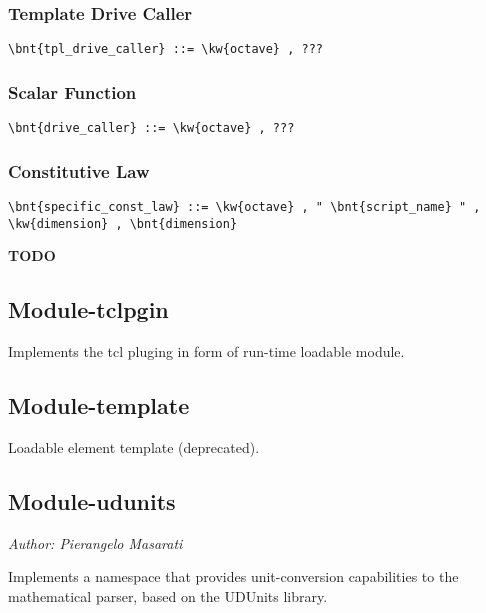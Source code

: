 \subsubsection{Template Drive Caller}
\begin{Verbatim}[commandchars=\\\{\}]
    \bnt{tpl_drive_caller} ::= \kw{octave} , ???
\end{Verbatim}

\subsubsection{Scalar Function}
\begin{Verbatim}[commandchars=\\\{\}]
    \bnt{drive_caller} ::= \kw{octave} , ???
\end{Verbatim}

\subsubsection{Constitutive Law}
\begin{Verbatim}[commandchars=\\\{\}]
    \bnt{specific_const_law} ::= \kw{octave} , " \bnt{script_name} " , \kw{dimension} , \bnt{dimension}
\end{Verbatim}

\textbf{TODO}



\subsection{Module-tclpgin}
Implements the tcl pluging in form of run-time loadable module.
 
\subsection{Module-template}
Loadable element template (deprecated).

\subsection{Module-udunits}
\emph{Author: Pierangelo Masarati}

\noindent
Implements a namespace that provides unit-conversion capabilities
to the mathematical parser, based on the UDUnits library.

